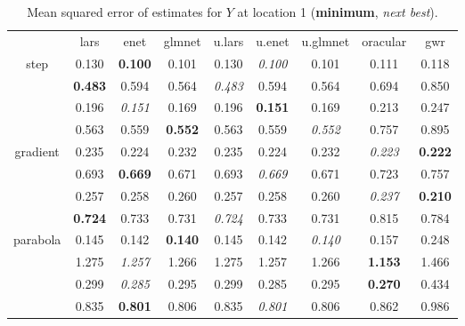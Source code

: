 \documentclass[authoryear, review, 11pt]{elsarticle}
\begin{document}
\begin{table}[ht]
\begin{center}
\begin{tabular}{ccccccccc}
  & lars & enet & glmnet & u.lars & u.enet & u.glmnet & oracular & gwr \\ 
  \cline{2-9}
  \multirow{4}{*}{step} & 0.130 & \textbf{0.100} & 0.101 & 0.130 & \emph{0.100} & 0.101 & 0.111 & 0.118 \\ 
  & \textbf{0.483} & 0.594 & 0.564 & \emph{0.483} & 0.594 & 0.564 & 0.694 & 0.850 \\ 
  & 0.196 & \emph{0.151} & 0.169 & 0.196 & \textbf{0.151} & 0.169 & 0.213 & 0.247 \\ 
  & 0.563 & 0.559 & \textbf{0.552} & 0.563 & 0.559 & \emph{0.552} & 0.757 & 0.895 \\ 
  \cline{2-9}
  \multirow{4}{*}{gradient} & 0.235 & 0.224 & 0.232 & 0.235 & 0.224 & 0.232 & \emph{0.223} & \textbf{0.222} \\ 
  & 0.693 & \textbf{0.669} & 0.671 & 0.693 & \emph{0.669} & 0.671 & 0.723 & 0.757 \\ 
  & 0.257 & 0.258 & 0.260 & 0.257 & 0.258 & 0.260 & \emph{0.237} & \textbf{0.210} \\ 
  & \textbf{0.724} & 0.733 & 0.731 & \emph{0.724} & 0.733 & 0.731 & 0.815 & 0.784 \\ 
  \cline{2-9}
  \multirow{4}{*}{parabola} & 0.145 & 0.142 & \textbf{0.140} & 0.145 & 0.142 & \emph{0.140} & 0.157 & 0.248 \\ 
  & 1.275 & \emph{1.257} & 1.266 & 1.275 & 1.257 & 1.266 & \textbf{1.153} & 1.466 \\ 
  & 0.299 & \emph{0.285} & 0.295 & 0.299 & 0.285 & 0.295 & \textbf{0.270} & 0.434 \\ 
  & 0.835 & \textbf{0.801} & 0.806 & 0.835 & \emph{0.801} & 0.806 & 0.862 & 0.986 \\ 
  \end{tabular}
\caption{Mean squared error of estimates for $Y$ at location 1 (\textbf{minimum}, \emph{next best}).\label{table:loc1-MSEY}}
\end{center}
\end{table}
\end{document}
